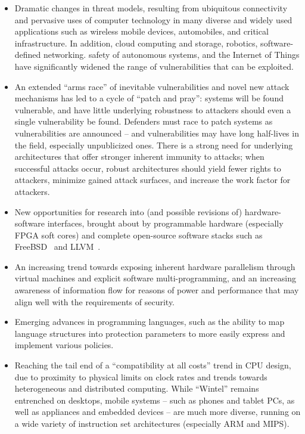 \begin{itemize}
\item Dramatic changes in threat models, resulting from ubiquitous
connectivity and pervasive uses of computer technology in many
diverse and widely used applications such as wireless mobile
devices, automobiles, and critical infrastructure.  
In addition, cloud computing and storage, robotics, software-defined
networking.  safety of autonomous systems, and the Internet of Things have
significantly widened the range of vulnerabilities that can be exploited.

\item An extended ``arms race'' of inevitable vulnerabilities and novel new
attack mechanisms has led to a cycle of ``patch and pray'': systems will be
found vulnerable, and have little underlying robustness to attackers should
even a single vulnerability be found.
Defenders must race to patch systems as vulnerabilities are announced -- and
vulnerabilities may have long half-lives in the field, especially unpublicized ones.
There is a strong need for underlying architectures that offer stronger
inherent immunity to attacks; when successful attacks occur, robust
architectures should yield fewer rights to attackers, minimize gained attack
surfaces, and increase the work factor for attackers.

\item New opportunities for research into (and possible revisions of)
hardware-software interfaces, brought about by programmable hardware
(especially FPGA soft cores)
and complete open-source software stacks such as
FreeBSD~\cite{mckusick:freebsd} and LLVM~\cite{LA04}.

\item An increasing trend towards exposing inherent hardware parallelism
through virtual machines and explicit software
multi-programming, and an increasing awareness of information flow
for reasons of power and performance that may align well with the
requirements of security.

\item Emerging advances in programming languages, such as the ability
to map language structures into protection parameters to
more easily express and implement various policies.

\item Reaching the tail end of a ``compatibility at all costs'' trend in
CPU design, due to
proximity to physical limits on clock rates and
trends towards heterogeneous and distributed computing.
While ``Wintel'' remains entrenched on desktops, mobile systems -- such as
phones and tablet PCs, as well as appliances and embedded devices -- are
much more diverse, running on a wide variety of instruction set architectures
(especially ARM and MIPS).


\end{itemize}

